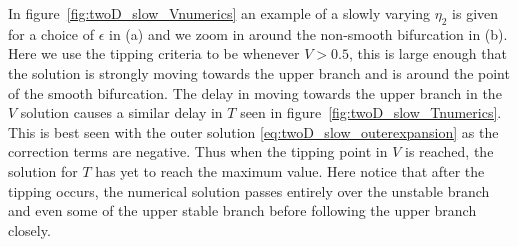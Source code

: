 In figure~\ref{fig:twoD_slow_Vnumerics} an example of a slowly varying $\eta_2$ is given for a choice of $\epsilon$ in (a) and we zoom in around the non-smooth bifurcation in (b). Here we use the tipping criteria to be whenever $V>0.5$, this is large enough that the solution is strongly moving towards the upper branch and is around the point of the smooth bifurcation. The delay in moving towards the upper branch in the $V$ solution causes a similar delay in $T$ seen in figure~\ref{fig:twoD_slow_Tnumerics}. This is best seen with the outer solution \eqref{eq:twoD_slow_outerexpansion} as the correction terms are negative. Thus when the tipping point in $V$ is reached, the solution for $T$ has yet to reach the maximum value. Here notice that after the tipping occurs, the numerical solution passes entirely over the unstable branch and even some of the upper stable branch before following the upper branch closely.

